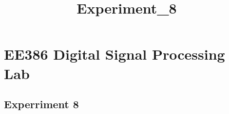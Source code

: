 \documentclass[11pt]{article}
\title{Experiment\_8}
\begin{document}
    
    \maketitle
    
    

    
    \hypertarget{ee386-digital-signal-processing-lab}{%
\section{EE386 Digital Signal Processing
Lab}\label{ee386-digital-signal-processing-lab}}

\hypertarget{experriment-8}{%
\subsection{Experriment 8}\label{experriment-8}}
\end{document}
